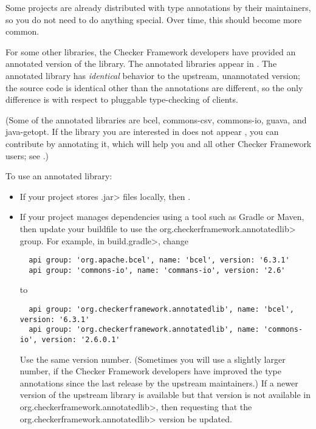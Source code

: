 Some projects are already distributed with type annotations by their
maintainers, so you do not need to do anything special.
Over time, this should become more common.

For some other libraries, the Checker Framework developers have provided an
annotated version of the library.
The annotated libraries appear in
.
The annotated library has \emph{identical} behavior to the upstream,
unannotated version; the source code is identical other than the
annotations are different, so the only difference is with respect to
pluggable type-checking of clients.

(Some of the annotated libraries are
bcel,
commons-csv,
commons-io,
guava,
and
java-getopt.
If the library you are interested in does not appear
, you can contribute by annotating it, which will
help you and all other Checker Framework users; see
.)

To use an annotated library:

\begin{itemize}
\item
If your project stores \<.jar> files locally, then
.

\item
If your project manages dependencies using a tool such as Gradle or Maven,
then update your buildfile to use the \<org.checkerframework.annotatedlib>
group.  For example, in \<build.gradle>, change

\begin{Verbatim}
  api group: 'org.apache.bcel', name: 'bcel', version: '6.3.1'
  api group: 'commons-io', name: 'commans-io', version: '2.6'
\end{Verbatim}

\noindent
to

\begin{Verbatim}
  api group: 'org.checkerframework.annotatedlib', name: 'bcel', version: '6.3.1'
  api group: 'org.checkerframework.annotatedlib', name: 'commons-io', version: '2.6.0.1'
\end{Verbatim}

\noindent
Use the same version number.  (Sometimes you will use a slightly larger
number, if the Checker Framework developers have improved the type
annotations since the last release by the upstream maintainers.)  If a
newer version of the upstream library is available but that version is not
available in \<org.checkerframework.annotatedlib>, then
 requesting that the
\<org.checkerframework.annotatedlib> version be updated.
\end{itemize}

